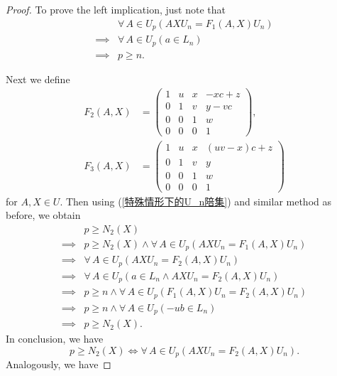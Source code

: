 \documentclass[11pt]{amsart}
\theoremstyle{definition}
\theoremstyle{remark}
\numberwithin{equation}{section}
\def\itx#1{{\mbox{\textrm{ #1 }}}}
\begin{document}
\begin{proof}
    To prove the left implication, just note that
    \begin{align*}
        &\forall\,A\in U_p\left(AXU_n=F_1(A,X)U_n\right)\\
        \implies&\forall\,A\in U_p\left(a\in L_n\right)\\
        \implies&p\geq n.
    \end{align*}

    Next we define
    \begin{align*}
        F_2(A,X)&=\begin{pmatrix}
            1 & u & x & -xc+z\\
            0 & 1 & v & y - v c\\
            0 & 0 & 1 & w\\
            0 & 0 & 0 & 1
        \end{pmatrix} ,\\%
        F_3(A,X)&=\begin{pmatrix}
            1 & u & x & (uv-x)c+z\\
            0 & 1 & v & y\\
            0 & 0 & 1 & w\\
            0 & 0 & 0 & 1
        \end{pmatrix}
    \end{align*}
    for $A,X\in U$. Then using (\ref{特殊情形下的U_n陪集}) and similar method as before, we obtain
    \begin{align*}
        &p\geq N_2(X)\\
        \implies&p\geq N_2(X)\land\forall\,A\in U_p\left(AXU_n=F_1(A,X)U_n\right)\\
        \implies&\forall\,A\in U_p\left(AXU_n=F_2(A,X)U_n\right)\\
        \implies&\forall\,A\in U_p\left(a\in L_n\land AXU_n=F_2(A,X)U_n\right)\\
        \implies&p\geq n\land\forall\,A\in U_p\left(F_1(A,X)U_n=F_2(A,X)U_n\right)\\
        \implies&p\geq n\land\forall\,A\in U_p\left(-ub\in L_n\right)\\
        \implies&p\geq N_2(X).
    \end{align*}
    In conclusion, we have
    \begin{equation}\label{矩阵等式不改变uvwx的等价条件}
        p\geq N_2(X)\iff\forall\,A\in U_p\left(AXU_n=F_2(A,X)U_n\right).
    \end{equation}
    Analogously, we have

\end{proof}
\end{document}
